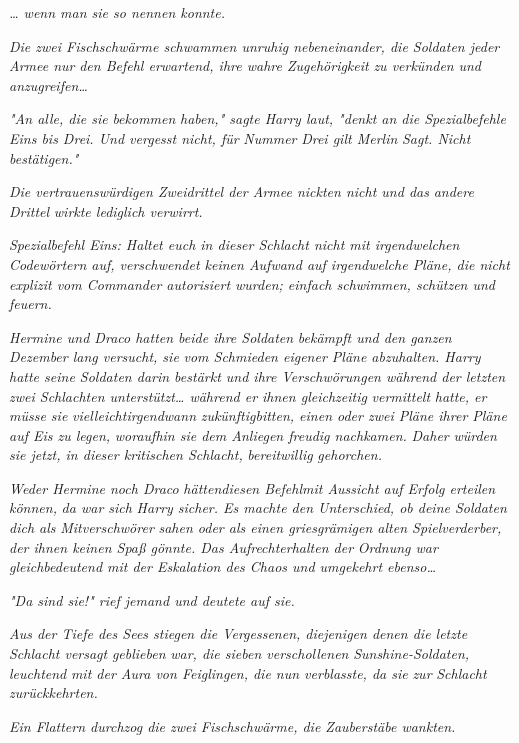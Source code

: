 {\emph{… wenn man sie so nennen konnte.}

\emph{Die zwei Fischschwärme schwammen unruhig nebeneinander, die Soldaten jeder Armee nur} \emph{den Befehl erwartend, ihre wahre Zugehörigkeit} \emph{zu verkünden} \emph{und anzugreifen…}

\emph{"An alle, die sie} \emph{bekommen} \emph{haben," sagte Harry laut, "denkt an die Spezialbefehle Eins bis Drei. Und vergesst nicht, für} \emph{Nummer} \emph{Drei gilt Merlin} \emph{Sagt. Nicht bestätigen."}

\emph{Die vertrauenswürdigen Zweidrittel der Armee nickten nicht und das} \emph{andere Drittel} \emph{wirkte lediglich verwirrt.}

\emph{\emph{Spezialbefehl Eins: Haltet euch in dieser Schlacht nicht mit irgendwelchen Codewörtern auf, verschwendet keinen Aufwand auf irgendwelche Pläne, die nicht explizit vom Commander autorisiert wurden; einfach schwimmen, schützen und feuern.}}

\emph{Hermine und Draco hatten beide ihre Soldaten} \emph{bekämpft und den ganzen Dezember lang versucht, sie} \emph{vom Schmieden eigener Pläne abzuhalten. Harry hatte seine Soldaten darin bestärkt und ihre Verschwörungen während der letzten zwei Schlachten unterstützt… während er ihnen gleichzeitig} \emph{vermittelt} \emph{hatte, er müsse sie} \emph{vielleichtirgendwann} \emph{\emph{zukünftig}bitten, einen oder zwei Pläne ihrer Pläne auf Eis zu legen,} \emph{woraufhin sie dem Anliegen freudig nachkamen.} \emph{Daher} \emph{würden sie jetzt, in dieser kritischen Schlacht,} \emph{bereitwillig} \emph{gehorchen.}

\emph{Weder Hermine noch Draco} \emph{hättendiesen Befehlmit Aussicht auf Erfolg erteilen können,} \emph{da war sich} \emph{Harry sicher. Es machte den Unterschied, ob deine Soldaten dich als} \emph{Mitverschwörer} \emph{sahen oder als einen griesgrämigen alten Spielverderber, der ihnen keinen Spaß gönnte. Das Aufrechterhalten der} \emph{Ordnung war gleichbedeutend mit der Eskalation des Chaos und umgekehrt ebenso…}

\emph{"Da sind sie!" rief jemand und deutete auf sie.}

\emph{Aus der Tiefe des Sees stiegen die Vergessenen, diejenigen denen die letzte Schlacht versagt} \emph{geblieben} \emph{war, die sieben verschollenen} \emph{Sunshine-Soldaten,} \emph{leuchtend} \emph{mit der Aura von Feiglingen, die nun verblasste, da sie} \emph{zur} \emph{Schlacht zurückkehrten.}

\emph{Ein Flattern durchzog die zwei Fischschwärme, die Zauberstäbe wankten.}

}
